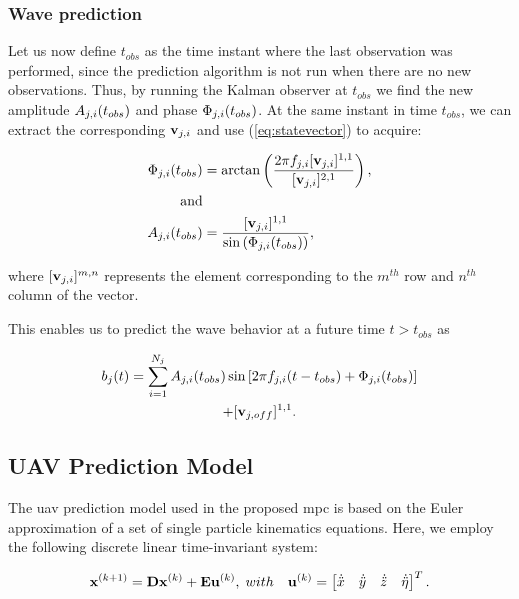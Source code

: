 \documentclass[letterpaper, 10 pt, journal, twoside]{IEEEtran}
\begin{document}
\subsubsection{Wave prediction}
Let us now define $t_{obs}$ as the time instant where the last observation was performed, since the prediction algorithm is not run when there are no new observations. Thus, by running the Kalman observer at $t_{obs}$ we find the new amplitude $A_{j,i}(t_{obs})$ and phase $\Phi_{j,i}(t_{obs})$. At the same instant in time $t_{obs}$, we can extract the corresponding $\mathbf{v}_{j,i}$ and use (\ref{eq:statevector}) to acquire:
\begin{small}
\begin{equation}
    \begin{aligned}
    \Phi_{j,i}(t_{obs}) &= \arctan \left(\frac{2\pi f_{j,i}[\mathbf{v}_{j,i}]^{1,1}}{[\mathbf{v}_{j,i}]^{2,1}}\right),\\
    \text{and}\\
    A_{j,i}(t_{obs}) &= \frac{[\mathbf{v}_{j,i}]^{1,1}}{\sin{(\Phi_{j,i}(t_{obs}))}},\\
    \end{aligned}
\end{equation}
\end{small}
where $[\mathbf{v}_{j,i}]^{m,n}$ represents the element corresponding to the $m^{th}$ row and $n^{th}$ column of the vector.

This enables us to predict the wave behavior at a future time $t > t_{obs}$ as
\begin{small}
\begin{multline}
    \label{eq:usv_model}
    b_j(t) = \sum_{i=1}^{N_j}A_{j,i}(t_{obs}) \sin{\left[2\pi f_{j,i}(t - t_{obs}) + \Phi_{j,i}(t_{obs})\right]} \\
     + [\mathbf{v}_{j,off}]^{1,1}.
\end{multline}
\end{small}

\subsection{UAV Prediction Model}

The \ac{uav} prediction model used in the proposed \ac{mpc} is based on the Euler approximation of a set of single particle kinematics equations. Here, we employ the following discrete linear time-invariant system:
\begin{footnotesize}
\begin{equation}
    \mathbf{x}^{(k+1)} = \mathbf{D}\mathbf{x}^{(k)} + \mathbf{E}\mathbf{u}^{(k)},    \label{eq:uav_state_eqn}\; with \quad
    \mathbf{u}^{(k)} =
    \begin{bmatrix}
        \dot{\ddot{x}} & \dot{\ddot{y}} & \dot{\ddot{z}} & \dot{\ddot{\eta}} 
    \end{bmatrix}^T.
\end{equation}
\end{footnotesize}
\end{document}
